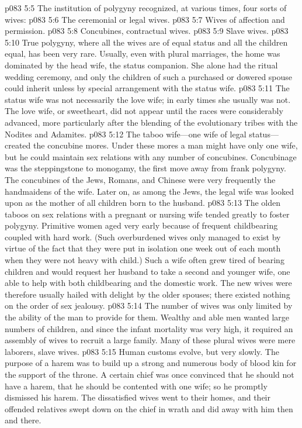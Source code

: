 \vs p083 5:5 The institution of polygyny recognized, at various times, four sorts of wives:
\pc \vs p083 5:6 \bibnobreakspace The ceremonial or legal wives.
\vs p083 5:7 \bibnobreakspace Wives of affection and permission.
\vs p083 5:8 \bibnobreakspace Concubines, contractual wives.
\vs p083 5:9 \bibnobreakspace Slave wives.
\pc \vs p083 5:10 True polygyny, where all the wives are of equal status and all the children equal, has been very rare. Usually, even with plural marriages, the home was dominated by the head wife, the status companion. She alone had the ritual wedding ceremony, and only the children of such a purchased or dowered spouse could inherit unless by special arrangement with the status wife.
\vs p083 5:11 The status wife was not necessarily the love wife; in early times she usually was not. The love wife, or sweetheart, did not appear until the races were considerably advanced, more particularly after the blending of the evolutionary tribes with the Nodites and Adamites.
\vs p083 5:12 The taboo wife---one wife of legal status---created the concubine mores. Under these mores a man might have only one wife, but he could maintain sex relations with any number of concubines. Concubinage was the steppingstone to monogamy, the first move away from frank polygyny. The concubines of the Jews, Romans, and Chinese were very frequently the handmaidens of the wife. Later on, as among the Jews, the legal wife was looked upon as the mother of all children born to the husband.
\vs p083 5:13 The olden taboos on sex relations with a pregnant or nursing wife tended greatly to foster polygyny. Primitive women aged very early because of frequent childbearing coupled with hard work. (Such overburdened wives only managed to exist by virtue of the fact that they were put in isolation one week out of each month when they were not heavy with child.) Such a wife often grew tired of bearing children and would request her husband to take a second and younger wife, one able to help with both childbearing and the domestic work. The new wives were therefore usually hailed with delight by the older spouses; there existed nothing on the order of sex jealousy.
\vs p083 5:14 The number of wives was only limited by the ability of the man to provide for them. Wealthy and able men wanted large numbers of children, and since the infant mortality was very high, it required an assembly of wives to recruit a large family. Many of these plural wives were mere laborers, slave wives.
\vs p083 5:15 Human customs evolve, but very slowly. The purpose of a harem was to build up a strong and numerous body of blood kin for the support of the throne. A certain chief was once convinced that he should not have a harem, that he should be contented with one wife; so he promptly dismissed his harem. The dissatisfied wives went to their homes, and their offended relatives swept down on the chief in wrath and did away with him then and there.\plusone
